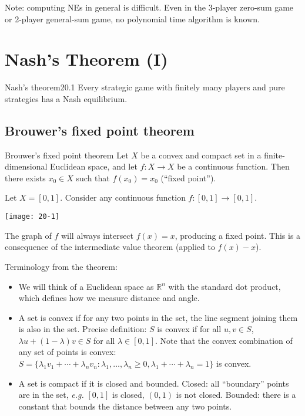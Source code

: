 \documentclass[12pt,letterpaper]{report}
\begin{document}
Note: computing NEs in general is difficult.
Even in the 3-player zero-sum game or 2-player general-sum game, no polynomial time algorithm is
known.

\section{Nash's Theorem (I)}

\begin{thm}{Nash's theorem}{20.1}
  Every strategic game with finitely many players and pure strategies has a Nash equilibrium.
\end{thm}

\subsection{Brouwer's fixed point theorem}

\begin{thm*}{Brouwer's fixed point theorem}
  Let $X$ be a convex and compact set in a finite-dimensional Euclidean space, and let
  $f \colon X \to X$ be a continuous function.
  Then there exists $x_0 \in X$ such that $f(x_0) = x_0$ (``fixed point'').
\end{thm*}

\begin{ex}
  Let $X = [0, 1]$.
  Consider any continuous function $f \colon [0, 1] \to [0, 1]$.

  \begin{center}
    \texttt{[image: 20-1]}
  \end{center}

  The graph of $f$ will always intersect $f(x) = x$, producing a fixed point.
  This is a consequence of the intermediate value theorem (applied to $f(x) - x$).
\end{ex}

Terminology from the theorem:
\begin{itemize}
  \item
  We will think of a Euclidean space as $\mathbb{R}^n$ with the standard dot product, which defines
  how we measure distance and angle.
  \item
  A set is convex if for any two points in the set, the line segment joining them is also in the
  set.
  Precise definition: $S$ is convex if for all $u, v \in S$, $\lambda u + (1 - \lambda) v \in S$ for
  all $\lambda \in [0, 1]$.
  Note that the convex combination of any set of points is convex:
  $S = \{ \lambda_1 v_1 + \cdots + \lambda_n v_n : \lambda_1, \ldots, \lambda_n \geq 0,
    \lambda_1 + \cdots + \lambda_n = 1 \}$ is convex.
  \item
  A set is compact if it is closed and bounded.
  Closed: all ``boundary'' points are in the set, \emph{e.g.} $[0, 1]$ is closed, $(0, 1)$ is not
  closed.
  Bounded: there is a constant that bounds the distance between any two points.
\end{itemize}
\end{document}
